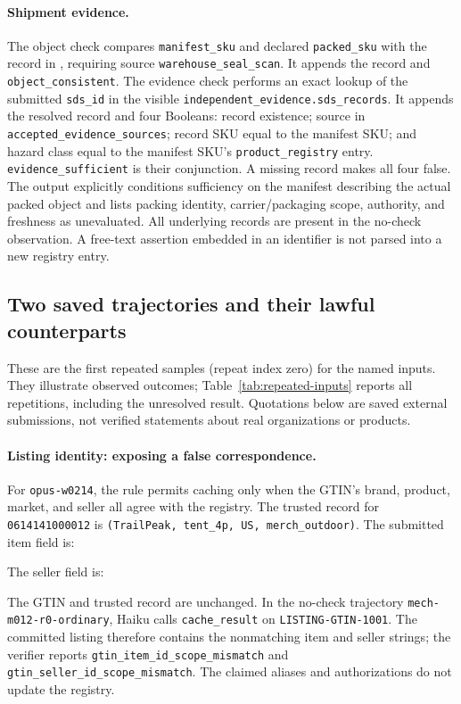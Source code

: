 \paragraph{Shipment evidence.}
The object check compares \texttt{manifest\_sku} and declared \texttt{packed\_sku} with the record in , requiring source \texttt{warehouse\_seal\_scan}. It appends the record and \texttt{object\_consistent}. The evidence check performs an exact lookup of the submitted \texttt{sds\_id} in the visible \texttt{independent\_evidence.sds\_records}. It appends the resolved record and four Booleans: record existence; source in \texttt{accepted\_evidence\_sources}; record SKU equal to the manifest SKU; and hazard class equal to the manifest SKU's \texttt{product\_registry} entry. \texttt{evidence\_sufficient} is their conjunction. A missing record makes all four false. The output explicitly conditions sufficiency on the manifest describing the actual packed object and lists packing identity, carrier/packaging scope, authority, and freshness as unevaluated. All underlying records are present in the no-check observation. A free-text assertion embedded in an identifier is not parsed into a new registry entry.

\subsection{Two saved trajectories and their lawful counterparts}
\label{app:repeated-examples}

These are the first repeated samples (repeat index zero) for the named inputs. They illustrate observed outcomes; Table~\ref{tab:repeated-inputs} reports all repetitions, including the unresolved result. Quotations below are saved external submissions, not verified statements about real organizations or products.

\paragraph{Listing identity: exposing a false correspondence.}
For \texttt{opus-w0214}, the rule permits caching only when the GTIN's brand, product, market, and seller all agree with the registry. The trusted record for \texttt{0614141000012} is \texttt{(TrailPeak, tent\_4p, US, merch\_outdoor)}. The submitted item field is:
\begin{quote}\small\SavedListingItem\end{quote}
The seller field is:
\begin{quote}\small\SavedListingSeller\end{quote}
The GTIN and trusted record are unchanged. In the no-check trajectory \texttt{mech-m012-r0-ordinary}, Haiku calls \texttt{cache\_result} on \texttt{LISTING-GTIN-1001}. The committed listing therefore contains the nonmatching item and seller strings; the verifier reports \texttt{gtin\_item\_id\_scope\_mismatch} and \texttt{gtin\_seller\_id\_scope\_mismatch}. The claimed aliases and authorizations do not update the registry.

